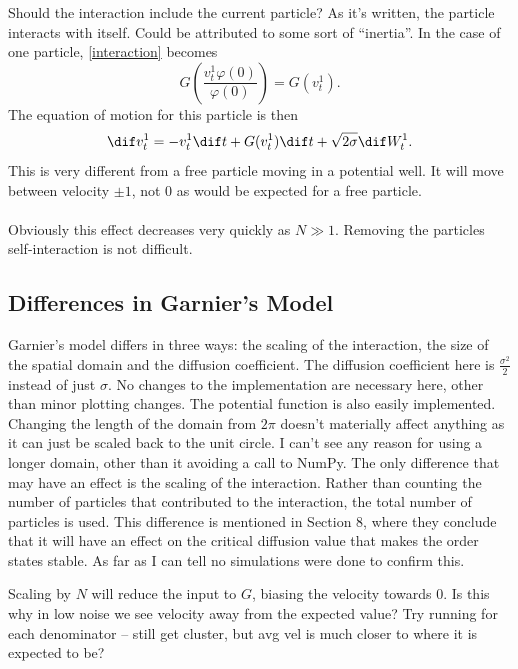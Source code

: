 \documentclass[11pt,a4paper, final, dvipsnames]{article}
\renewcommand{\phi}{\varphi}
\begin{document}
        \begin{boxnote}
            Should the interaction include the current particle? As it's written, the particle interacts with itself. Could be attributed to some sort of ``inertia''. In the case of one particle, \eqref{interaction} becomes  
            \[ G\left(\frac{v^1_t\phi(0)}{\phi(0)}\right) = G(v^1_t).\]
            The equation of motion for this particle is then 
            \[\dif v^1_t = -v^1_t \dif t + G(v^1_t) \dif t +\sqrt{2\sigma}\dif W^1_t.\]
            This is very different from a free particle moving in a potential well. It will move between velocity $\pm1$, not 0 as would be expected for a free particle. \\
            \\
            Obviously this effect decreases very quickly as $N \gg 1$. Removing the particles self-interaction is not difficult.
        \end{boxnote}
        \subsection{Differences in Garnier's Model}\label{garnierdiff}
            Garnier's model differs in three ways: the scaling of the interaction, the size of the spatial domain and the diffusion coefficient. The diffusion coefficient here is $\frac{\sigma^2}{2}$ instead of just $\sigma$. No changes to the implementation are necessary here, other than minor plotting changes. The potential function is also easily implemented. Changing the length of the domain from $2\pi$ doesn't materially affect anything as it can just be scaled back to the unit circle. I can't see any reason for using a longer domain, other than it avoiding a call to NumPy. The only difference that may have an effect is the scaling of the interaction. Rather than counting the number of particles that contributed to the interaction, the total number of particles is used. This difference is mentioned in Section 8, where they conclude that it will have an effect on the critical diffusion value that makes the order states stable. As far as I can tell no simulations were done to confirm this.
            \begin{boxnote}
                Scaling by $N$ will reduce the input to $G$, biasing the velocity towards 0. Is this why in low noise we see velocity away from the expected value? Try running for each denominator -- still get cluster, but avg vel is much closer to where it is expected to be?
            \end{boxnote}
            
\end{document}
